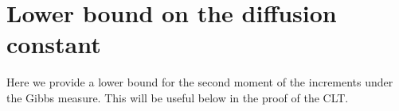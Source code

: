 \documentclass[a4paper,12pt,reqno]{amsart}
\begin{document}




\section{Lower bound on the diffusion constant}
\label{sec:lower}

Here we provide a lower bound for the second moment of the increments under the Gibbs measure. This will be useful below in the proof of the CLT.
\end{document}
